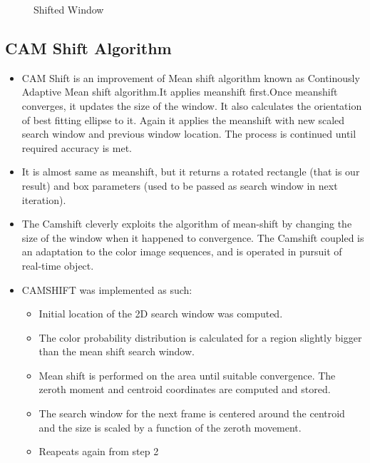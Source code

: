 \documentclass[11pt,a4paper]{article}
\begin{document}
\begin{itemize}
\begin{itemize}
\begin{figure}[h!]
			\centering
			\caption{Shifted Window}
		\end{figure}\subsection{CAM Shift Algorithm}
		
\end{itemize}

  \begin{itemize}
     \item CAM Shift is an improvement of Mean shift algorithm known as Continously Adaptive Mean shift algorithm.It applies meanshift first.Once meanshift converges, it updates the size of the window. It also calculates the orientation of best fitting ellipse to it. Again it applies the meanshift with new scaled search window and previous window location. The process is continued until required accuracy is met.
    
    \item  It is almost same as meanshift, but it returns a rotated rectangle (that is our result) and box parameters (used to be passed as search window in next iteration).
     \item The Camshift cleverly exploits the algorithm of mean-shift by changing the size of the window when it happened to convergence. The Camshift coupled is an adaptation to the color image sequences, and is operated in pursuit of real-time object.
       \item CAMSHIFT was implemented as such:
   \begin{itemize}
   
\item Initial location of the 2D search window was computed.
\item  The color probability distribution is calculated for a region slightly bigger than the mean shift search window.
\item  Mean shift is performed on the area until suitable 
convergence. The zeroth moment and centroid coordinates are computed and stored.
\item  The search window for the next frame is centered around the centroid and the size is scaled by a function of the zeroth movement.
\item Reapeats again from step 2
\newline
\end{itemize}	
\end{itemize}


\end{itemize}
\end{document}
